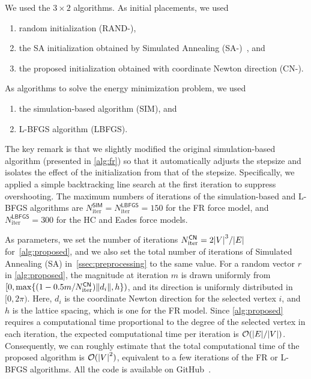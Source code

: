 \documentclass{jgaa-art}
\begin{document}
We used the $3 \times 2$ algorithms.
As initial placements, we used
\begin{enumerate}[label=\textbullet, itemsep=0pt, parsep=0pt]
  \item random initialization (\textsf{RAND-}),

  \item the SA initialization obtained by Simulated Annealing (\textsf{SA-})~\citep{ghassemitoosiSimulatedAnnealingPreProcessing2016}, and

  \item the proposed initialization obtained with coordinate Newton direction (\textsf{CN-}).
\end{enumerate}
As algorithms to solve the energy minimization problem, we used
\begin{enumerate}[label=\textbullet, itemsep=0pt, parsep=0pt]
  \item the simulation-based algorithm (\textsf{SIM}), and

  \item L-BFGS algorithm (\textsf{LBFGS}).
\end{enumerate}
The key remark is that we slightly modified the original simulation-based algorithm (presented in \cref{alg:fr}) so that it automatically adjusts the stepsize and isolates the effect of the initialization from that of the stepsize.
Specifically, we applied a simple backtracking line search at the first iteration to suppress overshooting.
The maximum numbers of iterations of the simulation-based and L-BFGS algorithms are $N_{\mathrm{iter}}^{\mathsf{SIM}}= N_{\mathrm{iter}}^{\mathsf{LBFGS}}= 150$ for the FR force model, and $N_{\mathrm{iter}}^{\mathsf{LBFGS}}= 300$ for the HC and Eades force models.

As parameters, we set the number of iterations $N_{\mathrm{iter}}^{\mathsf{CN}}= 2 \abs{V}^{3}/ \abs{E}$ for~\cref{alg:proposed}, and we also set the total number of iterations of Simulated Annealing (\textsf{SA}) in~\cref{ssec:preprocessing} to the same value.
For a random vector $r$ in \cref{alg:proposed}, the magnitude at iteration $m$ is drawn uniformly from $[0, \max\{(1 - 0.5 m / N_{\mathrm{iter}}^{\mathsf{CN}})\norm{d_i}, h\})$, and its direction is uniformly distributed in $[0, 2\pi)$.
Here, $d_i$ is the coordinate Newton direction for the selected vertex $i$, and $h$ is the lattice spacing, which is one for the FR model.
Since \cref{alg:proposed} requires a computational time proportional to the degree of the selected vertex in each iteration, the expected computational time per iteration is $\order*{\abs{E}/\abs{V}}$.
Consequently, we can roughly estimate that the total computational time of the proposed algorithm is $\order*{\abs{V}^2}$, equivalent to a few iterations of the FR or L-BFGS algorithms.
All the code is available on GitHub~\citep{ThisPaperGitHub}.
\end{document}
